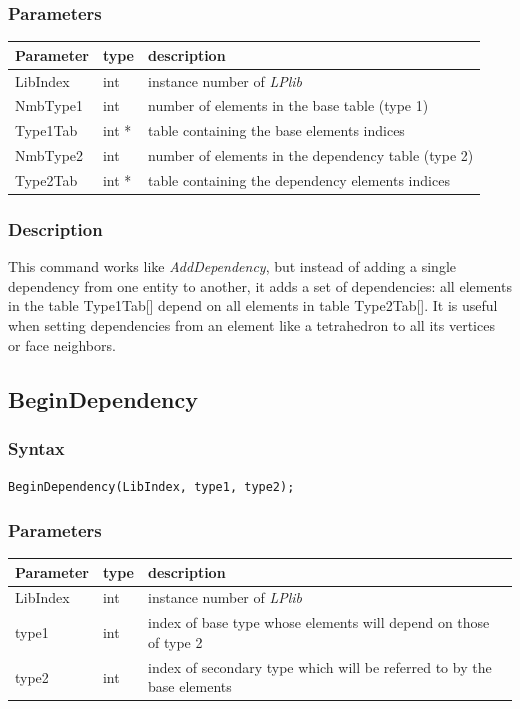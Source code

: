 \documentclass[a4paper,12pt]{article}
\begin{document}
\subsubsection*{Parameters}
\begin{tabular}{|m{2cm}|m{1.5cm}|m{10.5cm}|}
\hline
Parameter  & type   & description \\
\hline
LibIndex   & int    & instance number of \emph{LPlib} \\
\hline
NmbType1   & int    & number of elements in the base table (type 1) \\
\hline
Type1Tab   & int *  & table containing the base elements indices \\
\hline
NmbType2   & int    & number of elements in the dependency table (type 2) \\
\hline
Type2Tab   & int *  & table containing the dependency elements indices \\
\hline
\end{tabular}

\subsubsection*{Description}
This command works like \emph{AddDependency}, but instead of adding a single dependency from one entity to another, it adds a set of dependencies: all elements in the table Type1Tab[] depend on all elements in table Type2Tab[]. It is useful when setting dependencies from an element like a tetrahedron to all its vertices or face neighbors.


\subsection{BeginDependency}

\subsubsection*{Syntax}
\tt{BeginDependency(LibIndex, type1, type2);}
\normalfont

\subsubsection*{Parameters}
\begin{tabular}{|m{2cm}|m{1.5cm}|m{10.5cm}|}
\hline
Parameter  & type   & description \\
\hline
LibIndex   & int    & instance number of \emph{LPlib} \\
\hline
type1      & int    & index of base type whose elements will depend on those of type 2 \\
\hline
type2      & int    & index of secondary type which will be referred to by the base elements \\
\hline
\end{tabular}
\end{document}
